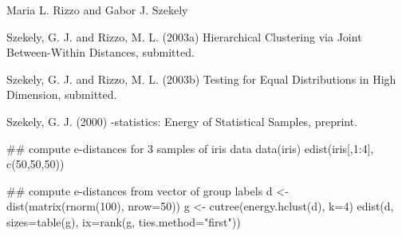 \documentclass{article}
\begin{document}
\begin{Author}\relax
Maria L. Rizzo  and
Gabor J. Szekely 
\end{Author}
\begin{References}\relax
Szekely, G. J. and Rizzo, M. L. (2003a) Hierarchical Clustering
via Joint Between-Within Distances, submitted.

Szekely, G. J. and Rizzo, M. L. (2003b) Testing for Equal
Distributions in High Dimension, submitted.

Szekely, G. J. (2000) -statistics: Energy of 
Statistical Samples, preprint.\end{References}
\begin{SeeAlso}\relax
{}
 
\end{SeeAlso}
\begin{Examples}
\begin{ExampleCode}
 ## compute e-distances for 3 samples of iris data
 data(iris)
 edist(iris[,1:4], c(50,50,50))


 ## compute e-distances from vector of group labels
 d <- dist(matrix(rnorm(100), nrow=50))
 g <- cutree(energy.hclust(d), k=4)
 edist(d, sizes=table(g), ix=rank(g, ties.method="first"))
 \end{ExampleCode}
\end{Examples}
\end{document}
